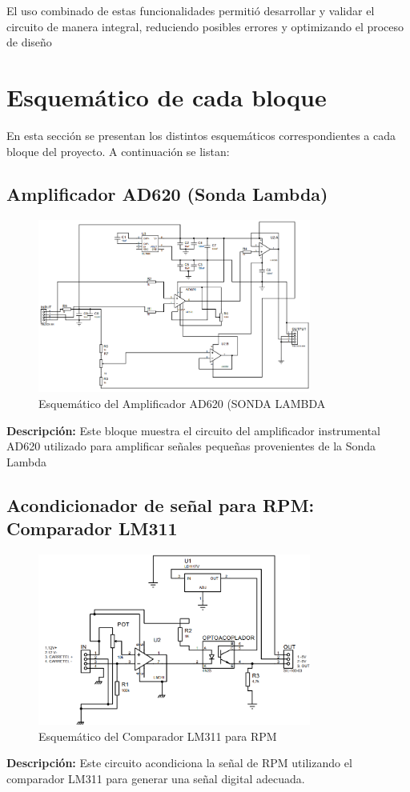 El uso combinado de estas funcionalidades permitió desarrollar y validar el circuito de manera integral, reduciendo posibles errores y optimizando el proceso de diseño

\section{Esquemático de cada bloque}

En esta sección se presentan los distintos esquemáticos correspondientes a cada bloque del proyecto. A continuación se listan:

\subsection{Amplificador AD620 (Sonda Lambda)}
\begin{figure}[H]
    \centering
    \includegraphics[width=0.8\textwidth]{Imagenes/AD620.png}
    \caption{Esquemático del Amplificador AD620 (SONDA LAMBDA}
    \label{fig:ad620}
\end{figure}
\textbf{Descripción:} Este bloque muestra el circuito del amplificador instrumental AD620 utilizado para amplificar señales pequeñas provenientes de la Sonda Lambda

\subsection{Acondicionador de señal para RPM: Comparador LM311}
\begin{figure}[H]
    \centering
    \includegraphics[width=0.8\textwidth]{Imagenes/Comparador de RPM.png}
    \caption{Esquemático del Comparador LM311 para RPM}
    \label{fig:lm311}
\end{figure}
\textbf{Descripción:} Este circuito acondiciona la señal de RPM utilizando el comparador LM311 para generar una señal digital adecuada.

